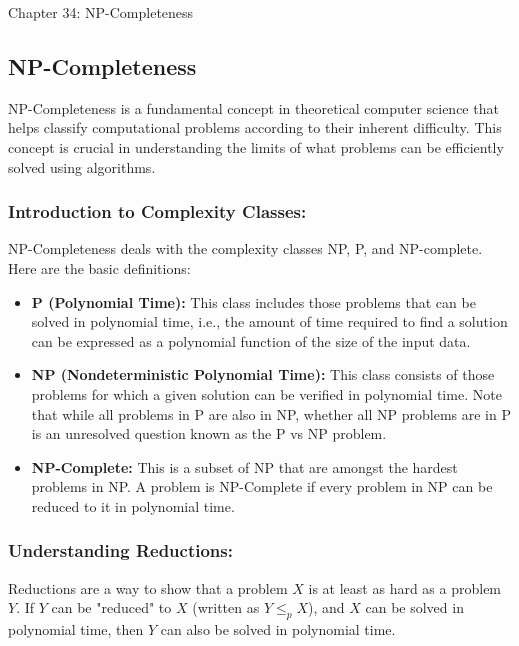 \begin{notes}{Chapter 34: NP-Completeness}
    \subsection*{NP-Completeness}

    NP-Completeness is a fundamental concept in theoretical computer science that helps classify computational problems according to their inherent difficulty. This concept is crucial in understanding 
    the limits of what problems can be efficiently solved using algorithms. \vspace*{1em}
    
    \subsubsection*{Introduction to Complexity Classes:}
    
    NP-Completeness deals with the complexity classes NP, P, and NP-complete. Here are the basic definitions:
    
    \begin{itemize}
        \item \textbf{P (Polynomial Time):} This class includes those problems that can be solved in polynomial time, i.e., the amount of time required to find a solution can be expressed as a polynomial 
        function of the size of the input data.
        \item \textbf{NP (Nondeterministic Polynomial Time):} This class consists of those problems for which a given solution can be verified in polynomial time. Note that while all problems in P are 
        also in NP, whether all NP problems are in P is an unresolved question known as the P vs NP problem.
        \item \textbf{NP-Complete:} This is a subset of NP that are amongst the hardest problems in NP. A problem is NP-Complete if every problem in NP can be reduced to it in polynomial time.
    \end{itemize}
    
    \subsubsection*{Understanding Reductions:}
    
    Reductions are a way to show that a problem $X$ is at least as hard as a problem $Y$. If $Y$ can be "reduced" to $X$ (written as $Y \leq_p X$), and $X$ can be solved in polynomial time, then $Y$ 
    can also be solved in polynomial time.
    

\end{notes}
